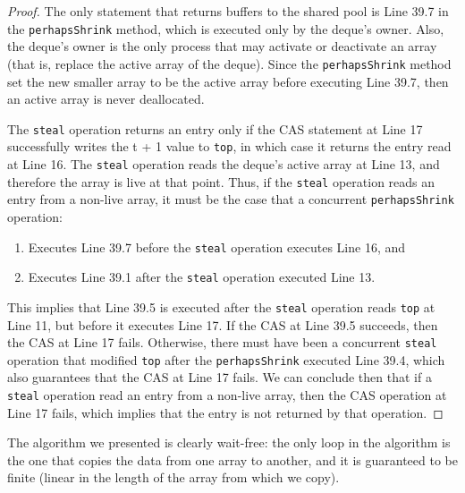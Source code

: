 \begin{proof}
  The only statement that returns buffers to the shared pool is Line
  39.7 in the \lstinline!perhapsShrink! method, which is executed only
  by the deque's owner. Also, the deque's owner is the only process
  that may activate or deactivate an array (that is, replace the
  active array of the deque). Since the \lstinline!perhapsShrink!
  method set the new smaller array to be the active array before
  executing Line 39.7, then an active array is never deallocated.

  The \lstinline!steal! operation returns an entry only if the CAS
  statement at Line 17 successfully writes the t + 1 value to
  \lstinline!top!, in which case it returns the entry read at Line
  16. The \lstinline!steal! operation reads the deque's active array
  at Line 13, and therefore the array is live at that point. Thus, if
  the \lstinline!steal! operation reads an entry from a non-live
  array, it must be the case that a concurrent
  \lstinline!perhapsShrink! operation:

  \begin{enumerate}
  \item Executes Line 39.7 before the \lstinline!steal! operation
    executes Line 16, and
  \item Executes Line 39.1 after the \lstinline!steal! operation
    executed Line 13.
  \end{enumerate}

  This implies that Line 39.5 is executed after the \lstinline!steal!
  operation reads \lstinline!top! at Line 11, but before it executes
  Line 17. If the CAS at Line 39.5 succeeds, then the CAS at Line 17
  fails. Otherwise, there must have been a concurrent
  \lstinline!steal! operation that modified \lstinline!top! after the
  \lstinline!perhapsShrink! executed Line 39.4, which also guarantees
  that the CAS at Line 17 fails. We can conclude then that if a
  \lstinline!steal! operation read an entry from a non-live array,
  then the CAS operation at Line 17 fails, which implies that the
  entry is not returned by that operation.
\end{proof}


The algorithm we presented is clearly wait-free: the only loop in the
algorithm is the one that copies the data from one array to another,
and it is guaranteed to be finite (linear in the length of the array
from which we copy).

